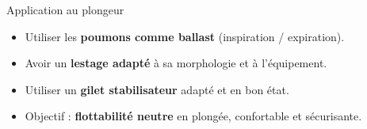 \begin{frame}{Application au plongeur}
  \begin{itemize}
    \item Utiliser les \textbf{poumons comme ballast} (inspiration / expiration).
    \item Avoir un \textbf{lestage adapté} à sa morphologie et à l’équipement.
    \item Utiliser un \textbf{gilet stabilisateur} adapté et en bon état.
    \item Objectif : \textbf{flottabilité neutre} en plongée, confortable et sécurisante.
  \end{itemize}
\end{frame}
